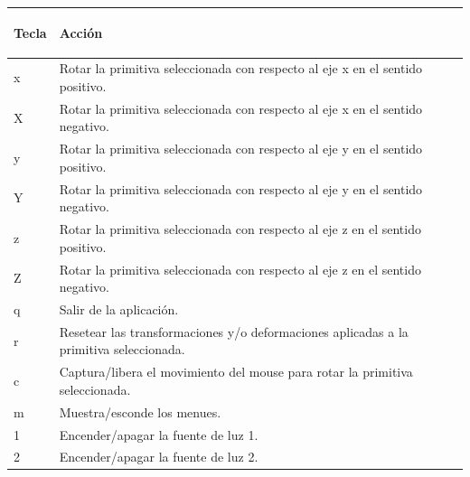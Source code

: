 \documentclass[11pt]{article}
\begin{document}
    \begin{tabular}{|| l | l ||}
      \hline
      \begin{large}Tecla\end{large} & 
	\begin{large}Acci\'{o}n \end{large} \\
          \hline
x & Rotar la primitiva seleccionada con respecto al eje x en el sentido positivo. \\
X & Rotar la primitiva seleccionada con respecto al eje x en el sentido negativo. \\
y & Rotar la primitiva seleccionada con respecto al eje y en el sentido positivo. \\
Y & Rotar la primitiva seleccionada con respecto al eje y en el sentido negativo. \\
z & Rotar la primitiva seleccionada con respecto al eje z en el sentido positivo. \\
Z & Rotar la primitiva seleccionada con respecto al eje z en el sentido negativo.  \\
q & Salir de la aplicaci\'on.  \\
r & Resetear las transformaciones y/o deformaciones aplicadas a la primitiva seleccionada.  \\
c & Captura/libera el movimiento del mouse para rotar la primitiva seleccionada.  \\
m & Muestra/esconde los menues.  \\
1 & Encender/apagar la fuente de luz 1.  \\
2 & Encender/apagar la fuente de luz 2.  \\

          \hline
    \end{tabular}
  
\end{document}
